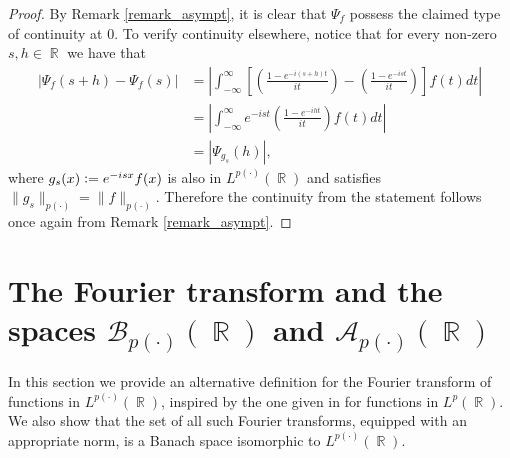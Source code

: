 \documentclass[11pt,reqno]{amsart}
\theoremstyle{definition}
\newtheorem{example}[theorem]{Example}
\theoremstyle{definition}
\theoremstyle{definition}
\DeclareMathOperator{\R}{\mathbb{R}}
\newcommand{\p}{p(\cdot)}
\newcommand{\Lp}{L^{\p}(\R)}
\newcommand{\defeq}{\vcentcolon=}
\begin{document}
\begin{proof}
    By Remark \ref{remark_asympt}, it is clear that $\Psi_f$ possess the claimed type of continuity at $0$. To verify continuity elsewhere, notice that  for every non-zero $s,h\in\R$ we have that
    \begin{align*}
        |\Psi_f(s+h)-\Psi_f(s)|&=\left|\int_{-\infty}^{\infty}\left[\left(\frac{1-e^{-i(s+h)t}}{it}\right)-\left(\frac{1-e^{-ist}}{it}\right)\right]f(t)dt\right|\\
        &=\left|\int_{-\infty}^{\infty}e^{-ist}\left(\frac{1-e^{-iht}}{it}\right)f(t)dt\right|\\
        &=|\Psi_{g_s}(h)|,
    \end{align*}
    where $g_s(x)\defeq e^{-isx}f(x)$ is also in $\Lp$ and satisfies $\|g_s\|_{\p}=\|f\|_{\p}$. Therefore the continuity from the statement follows once again from Remark \ref{remark_asympt}.
\end{proof}




\section{The Fourier transform and the spaces \texorpdfstring{$\mathcal{B}_{p(\cdot)}(\R)$}{} and \texorpdfstring{$\mathcal{A}_{\p}(\R)$}{}}\label{sec-fourier-transf}

In this section we provide an alternative definition for the Fourier transform of functions in $\Lp$,  inspired by the one given in \cite{Talvila2025} for functions in $L^p(\R)$. We also show that the set of all such Fourier transforms, equipped with an appropriate norm, is a Banach space isomorphic to $\Lp$.
\end{document}
